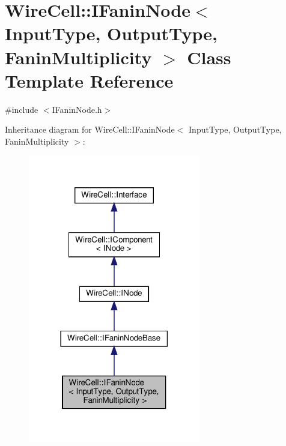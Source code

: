 \hypertarget{class_wire_cell_1_1_i_fanin_node}{}\section{Wire\+Cell\+:\+:I\+Fanin\+Node$<$ Input\+Type, Output\+Type, Fanin\+Multiplicity $>$ Class Template Reference}
\label{class_wire_cell_1_1_i_fanin_node}


{\ttfamily \#include $<$I\+Fanin\+Node.\+h$>$}



Inheritance diagram for Wire\+Cell\+:\+:I\+Fanin\+Node$<$ Input\+Type, Output\+Type, Fanin\+Multiplicity $>$\+:
\nopagebreak
\begin{figure}[H]
\begin{center}
\leavevmode
\includegraphics[width=213pt]{class_wire_cell_1_1_i_fanin_node__inherit__graph}
\end{center}
\end{figure}


